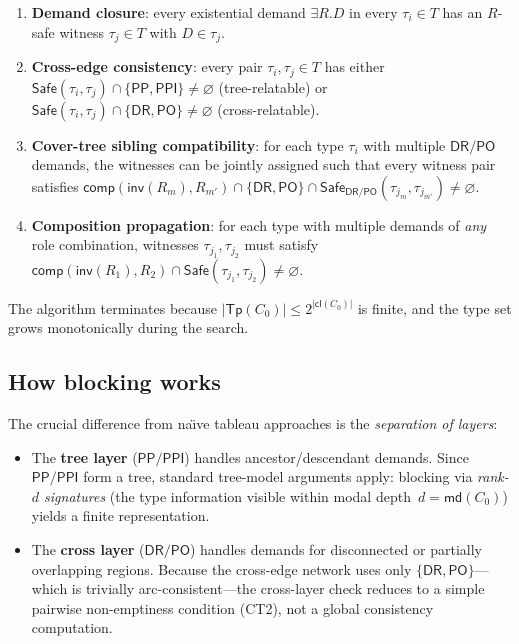 \documentclass[
]{ceurart}
\theoremstyle{definition}
\newcommand{\DR}{\ensuremath{\mathsf{DR}}}
\newcommand{\PO}{\ensuremath{\mathsf{PO}}}
\newcommand{\PP}{\ensuremath{\mathsf{PP}}}
\newcommand{\PPI}{\ensuremath{\mathsf{PPI}}}
\newcommand{\inv}{\ensuremath{\mathsf{inv}}}
\newcommand{\comp}{\ensuremath{\mathsf{comp}}}
\newcommand{\cl}{\ensuremath{\mathsf{cl}}}
\newcommand{\Tp}{\ensuremath{\mathsf{Tp}}}
\newcommand{\Safe}{\ensuremath{\mathsf{Safe}}}
\newcommand{\md}{\ensuremath{\mathsf{md}}}
\begin{document}
\begin{enumerate}[label=(CT\arabic*)]
  \item \textbf{Demand closure}: every existential demand
    $\exists R.D$ in every $\tau_i \in T$ has an $R$-safe
    witness $\tau_j \in T$ with $D \in \tau_j$.
  \item \textbf{Cross-edge consistency}: every pair
    $\tau_i, \tau_j \in T$ has either $\Safe(\tau_i,\tau_j)
    \cap \{\PP,\PPI\} \neq \varnothing$ (tree-relatable) or
    $\Safe(\tau_i,\tau_j) \cap \{\DR,\PO\} \neq \varnothing$
    (cross-relatable).
  \item \textbf{Cover-tree sibling compatibility}: for each
    type $\tau_i$ with multiple $\DR/\PO$ demands, the witnesses
    can be jointly assigned such that every witness pair satisfies
    $\comp(\inv(R_m), R_{m'}) \cap \{\DR,\PO\} \cap
    \Safe_{\DR/\PO}(\tau_{j_m}, \tau_{j_{m'}}) \neq \varnothing$.
  \item \textbf{Composition propagation}: for each type with
    multiple demands of \emph{any} role combination, witnesses
    $\tau_{j_1}, \tau_{j_2}$ must satisfy
    $\comp(\inv(R_1), R_2) \cap \Safe(\tau_{j_1}, \tau_{j_2})
    \neq \varnothing$.
\end{enumerate}

The algorithm terminates because $|\Tp(C_0)| \leq 2^{|\cl(C_0)|}$
is finite, and the type set grows monotonically during the search.

\subsection{How blocking works}

The crucial difference from na\"{\i}ve tableau approaches is the
\emph{separation of layers}:

\begin{itemize}
  \item The \textbf{tree layer} ($\PP/\PPI$) handles
    ancestor/descendant demands.  Since $\PP/\PPI$ form a tree,
    standard tree-model arguments apply: blocking via
    \emph{rank-$d$ signatures} (the type information visible
    within modal depth~$d = \md(C_0)$) yields a finite
    representation.

  \item The \textbf{cross layer} ($\DR/\PO$) handles demands for
    disconnected or partially overlapping regions.  Because the
    cross-edge network uses only $\{\DR,\PO\}$---which is
    trivially arc-consistent---the cross-layer check reduces to a
    simple pairwise non-emptiness condition (CT2), not a global
    consistency computation.
\end{itemize}
\end{document}
